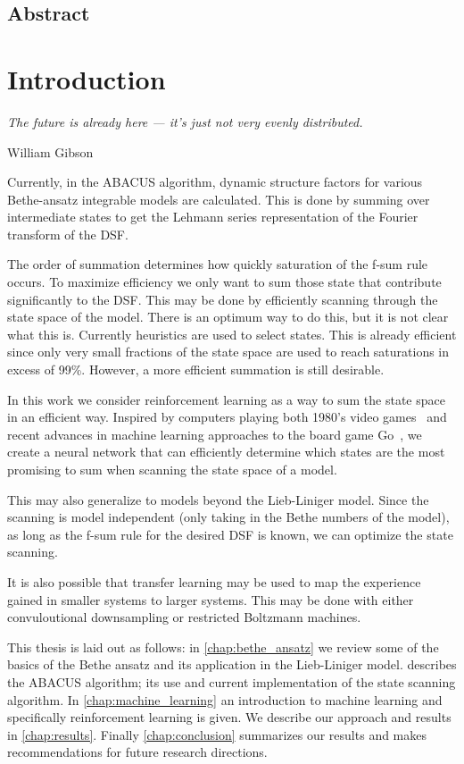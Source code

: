 \documentclass[11pt, a4paper]{report} %
\begin{document}
\newpage

\section*{Abstract}

\chapter{Introduction}

\epigraph{\textit{The future is already here --- it's just not very evenly distributed.}}{William Gibson}

Currently, in the ABACUS algorithm, dynamic structure factors for various Bethe-ansatz integrable models are calculated.
This is done by summing over intermediate states to get the Lehmann series representation of the Fourier transform of the DSF.

The order of summation determines how quickly saturation of the f-sum rule occurs.
To maximize efficiency we only want to sum those state that contribute significantly to the DSF.
This may be done by efficiently scanning through the state space of the model.
There is an optimum way to do this, but it is not clear what this is.
Currently heuristics are used to select states.
This is already efficient since only very small fractions of the state space are used to reach saturations in excess of 99\%.
However, a more efficient summation is still desirable.

In this work we consider reinforcement learning as a way to sum the state space in an efficient way.
Inspired by computers playing both 1980's video games~\cite{mnih13_playin_atari_with_deep_reinf_learn} and recent advances in machine learning approaches to the board game Go~\cite{Silver2017a,Silver2017}, we create a neural network that can efficiently determine which states are the most promising to sum when scanning the state space of a model.

This may also generalize to models beyond the Lieb-Liniger model.
Since the scanning is model independent (only taking in the Bethe numbers of the model), as long as the f-sum rule for the desired DSF is known, we can optimize the state scanning.

It is also possible that transfer learning may be used to map the experience gained in smaller systems to larger systems.
This may be done with either convuloutional downsampling or restricted Boltzmann machines.

This thesis is laid out as follows:
in \cref{chap:bethe_ansatz} we review some of the basics of the Bethe ansatz and its application in the Lieb-Liniger model.
 describes the ABACUS algorithm; its use and current implementation of the state scanning algorithm.
In \cref{chap:machine_learning} an introduction to machine learning and specifically reinforcement learning is given.
We describe our approach and results in \cref{chap:results}.
Finally \cref{chap:conclusion} summarizes our results and makes recommendations for future research directions.
\end{document}
